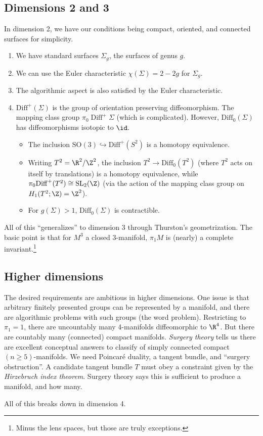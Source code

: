 \subsection{Dimensions 2 and 3}
In dimension 2, we have our conditions being compact, oriented, and connected surfaces for simplicity.
\begin{enumerate}[label=(\alph*)]
\setlength\itemsep{-.2em}
    \item We have standard surfaces $\Sigma_g$, the surfaces of genus $g$.
    \item We can use the Euler characteristic $\chi(\Sigma) = 2 - 2g$ for $\Sigma_g$. 
    \item The algorithmic aspect is also satisfied by the Euler characteristic.
    \item $\mathrm{Diff}^+ (\Sigma)$ is the group of orientation preserving diffeomorphism. The mapping class group $\pi_0\operatorname{Diff}^+\Sigma$ (which is complicated). However, $\mathrm{Diff}_0(\Sigma)$ has diffeomorphisms isotopic to $\id.$ 
        \begin{itemize}
        \setlength\itemsep{-.2em}
    \item The inclusion $\mathrm{SO}(3) \hookrightarrow \mathrm{Diff}^+(S^2)$ is a homotopy equivalence.
    \item Writing  $T^2 = \R^2 / \Z^2$, the inclusion $T^2 \to  \mathrm{Diff}_0(T^2)$ (where $T^2$ acts on itself by translations) is a homotopy equivalence, while $\pi_0 \mathrm{Diff}^+(T^2)\cong \mathrm{SL}_2(\Z)$ (via the action of the mapping class group on $H_1(T^2; \Z) = \Z^2$).
    \item For $g(\Sigma) >1 $, $\mathrm{Diff}_0(\Sigma)$ is contractible.
        \end{itemize}
\end{enumerate}
All of this ``generalizes'' to dimension 3 through Thurston's geometrization. The basic point is that for $M^3$ a closed 3-manifold, $\pi_1 M$ is (nearly) a complete invariant.\footnote{Minus the lens spaces, but those are truly exceptions.}

\subsection{Higher dimensions}
The desired requirements are ambitious in higher dimensions.
    One issue is that arbitrary finitely presented groups can be represented by a manifold, and there are algorithmic problems with such groups (the word problem). Restricting to $\pi_1 = 1$, there are uncountably many 4-manifolds diffeomorphic to $\R^4$. But there are countably many (connected) compact manifolds. 
\emph{Surgery theory} tells us there are excellent conceptual answers to classify of simply connected compact $(n \geq 5)$-manifolds. We need Poincar\'e duality, a tangent bundle, and ``surgery obstruction''. A candidate tangent bundle $T$ must obey a constraint given by the \emph{Hirzebruch index theorem}. Surgery theory says this is sufficient to produce a manifold, and how many.

All of this breaks down in dimension 4.

